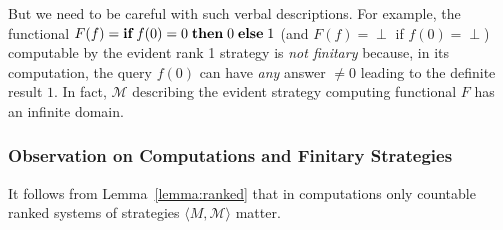 \documentclass[fleqn]{LMCS}
\theoremstyle{plain}\newtheorem{satz}[thm]{Satz}
\theoremstyle{plain}\newtheorem{hyp}[thm]{Hypothesis}
\theoremstyle{plain}\newtheorem{hyps}[thm]{Hypotheses}
\theoremstyle{definition}\newtheorem{note}[thm]{Note}
\newcommand{\la}{\langle}
\newcommand{\ra}{\rangle}
\newcommand{\tuple}[1]{\la #1 \ra}
\newcommand{\IF}{\mbox{\bf if}}
\newcommand{\THEN}{\mbox{\bf then}}
\newcommand{\ELSE}{\mbox{\bf else}}
\newcommand{\Undef}{{\perp}}
\newcommand{\MM}{{\mathcal M}}
\newcommand{\?}{\mbox{?}}
\begin{document}
\medskip

But we need to be careful with such verbal descriptions. 
For example, the functional
$F(f)=\IF\;f(0)=0\;\THEN\;0\;\ELSE\;1$ 
(and $F(f)=\Undef$ if $f(0)=\Undef$)
computable by the evident rank 1 strategy 
is 
\emph{not finitary} because, 
in its computation, the query $f(0)$ can have \emph{any} answer ${}\ne0$ 
leading to the definite result $1$. 
In fact, $\MM$ describing the evident strategy computing functional $F$ has an infinite 
domain. 






\subsubsection{Observation on Computations and Finitary Strategies}
\label{sec:observation}
It follows from Lemma~\ref{lemma:ranked} that 
in computations only countable ranked systems of strategies 
$\tuple{M,\MM}$ matter. 
\end{document}
